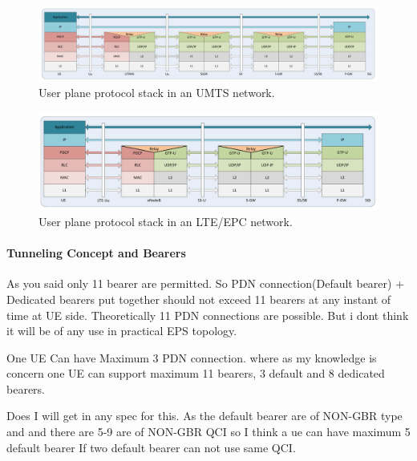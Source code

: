 \begin{figure}[htb]
	\centering
	\includegraphics[width=1.2\textwidth]{images/3g-userplane.pdf}
	\caption{User plane protocol stack in an UMTS network.}
	\label{c4:fig:3gpp-umtsuserplane}
\end{figure}

\begin{figure}[htb]
	\centering
	\includegraphics[width=1.2\textwidth]{images/LTE-userplane.pdf}
	\caption{User plane protocol stack in an LTE/EPC network.}
	\label{c4:fig:3gpp-lteuserplane}
\end{figure}





\paragraph{Tunneling Concept and Bearers}

As you said only 11 bearer are permitted.
So PDN connection(Default bearer) + Dedicated bearers put together should not exceed 11 bearers at any instant of time at UE side.
Theoretically 11 PDN connections are possible. But i dont think it will be of any use in practical EPS topology.

One UE Can have Maximum 3 PDN connection.
where as my knowledge is concern one UE can support maximum 11 bearers, 3 default and 8 dedicated bearers.

Does I will get in any spec for this. As the default bearer are of  NON-GBR type and and there are 5-9 are of NON-GBR QCI so I think a ue can have maximum 5 default bearer If two default bearer can not use same QCI.

